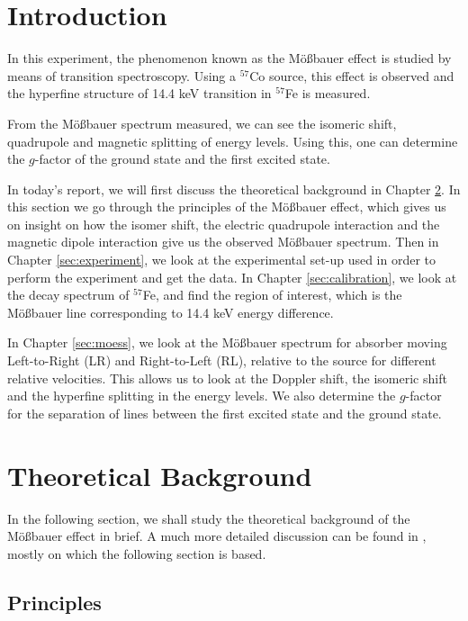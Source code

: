 \documentclass[a4paper]{report}
\numberwithin{equation}{section}
\begin{document}
\tableofcontents

\chapter{Introduction}

In this experiment, the phenomenon known as the M\"o{\ss}bauer effect is studied by means of transition spectroscopy. Using a $^{57}$Co source, this effect is observed and the hyperfine structure of 14.4 keV transition in $^{57}$Fe is measured. 

From the M\"o{\ss}bauer spectrum measured, we can see the isomeric shift, quadrupole and magnetic splitting of energy levels. Using this, one can determine the $g$-factor of the ground state and the first excited state.

In today's report, we will first discuss the theoretical background in Chapter \ref{sec:theory}. In this section we go through the principles of the M\"o{\ss}bauer effect, which gives us on insight on how the isomer shift, the electric quadrupole interaction and the magnetic dipole interaction give us the observed M\"o{\ss}bauer spectrum. Then in Chapter \ref{sec:experiment}, we look at the experimental set-up used in order to perform the experiment and get the data. In Chapter \ref{sec:calibration}, we look at the decay spectrum of $^{57}$Fe, and find the region of interest, which is the M\"o{\ss}bauer line corresponding to 14.4 keV energy difference. 

In Chapter \ref{sec:moess}, we look at the M\"o{\ss}bauer spectrum for absorber moving Left-to-Right (LR) and Right-to-Left (RL), relative to the source for different relative velocities. This allows us to look at the Doppler shift, the isomeric shift and the hyperfine splitting in the energy levels. We also determine the $g$-factor for the separation of lines between the first excited state and the ground state. 


\chapter{Theoretical Background} \label{sec:theory}
In the following section, we shall study the theoretical background of the M\"o{\ss}bauer effect in brief. A much more detailed discussion can be found in \cite{Schatz1996}, mostly on which the following section is based.

\section{Principles} \label{sec:principles}
\end{document}
